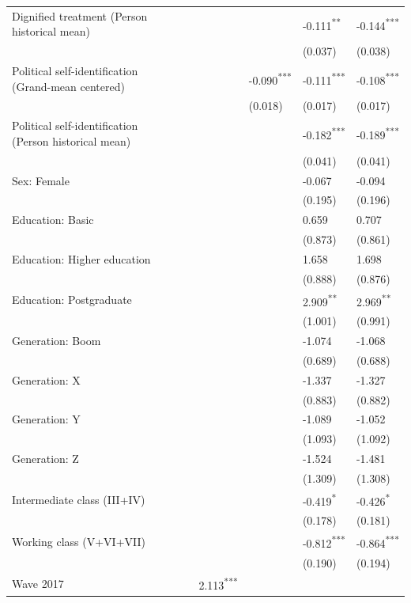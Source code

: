 \documentclass[
  spanish,
  a4paper,
  oneside]{scrbook}
\begin{document}
{\begin{longtable}[]{@{}llllll@{}}
Dignified treatment (Person historical mean) & ~ & ~ & ~ &
-0.111\textsuperscript{**} & -0.144\textsuperscript{***} \\
~ & ~ & ~ & ~ & (0.037) & (0.038) \\
Political self-identification (Grand-mean centered) & ~ & ~ &
-0.090\textsuperscript{***} & -0.111\textsuperscript{***} &
-0.108\textsuperscript{***} \\
~ & ~ & ~ & (0.018) & (0.017) & (0.017) \\
Political self-identification (Person historical mean) & ~ & ~ & ~ &
-0.182\textsuperscript{***} & -0.189\textsuperscript{***} \\
~ & ~ & ~ & ~ & (0.041) & (0.041) \\
Sex: Female & ~ & ~ & ~ & -0.067 & -0.094 \\
~ & ~ & ~ & ~ & (0.195) & (0.196) \\
Education: Basic & ~ & ~ & ~ & 0.659 & 0.707 \\
~ & ~ & ~ & ~ & (0.873) & (0.861) \\
Education: Higher education & ~ & ~ & ~ & 1.658 & 1.698 \\
~ & ~ & ~ & ~ & (0.888) & (0.876) \\
Education: Postgraduate & ~ & ~ & ~ & 2.909\textsuperscript{**} &
2.969\textsuperscript{**} \\
~ & ~ & ~ & ~ & (1.001) & (0.991) \\
Generation: Boom & ~ & ~ & ~ & -1.074 & -1.068 \\
~ & ~ & ~ & ~ & (0.689) & (0.688) \\
Generation: X & ~ & ~ & ~ & -1.337 & -1.327 \\
~ & ~ & ~ & ~ & (0.883) & (0.882) \\
Generation: Y & ~ & ~ & ~ & -1.089 & -1.052 \\
~ & ~ & ~ & ~ & (1.093) & (1.092) \\
Generation: Z & ~ & ~ & ~ & -1.524 & -1.481 \\
~ & ~ & ~ & ~ & (1.309) & (1.308) \\
Intermediate class (III+IV) & ~ & ~ & ~ & -0.419\textsuperscript{*} &
-0.426\textsuperscript{*} \\
~ & ~ & ~ & ~ & (0.178) & (0.181) \\
Working class (V+VI+VII) & ~ & ~ & ~ & -0.812\textsuperscript{***} &
-0.864\textsuperscript{***} \\
~ & ~ & ~ & ~ & (0.190) & (0.194) \\
Wave 2017 & ~ & 2.113\textsuperscript{***} & ~ &

\end{longtable}}
\end{document}
